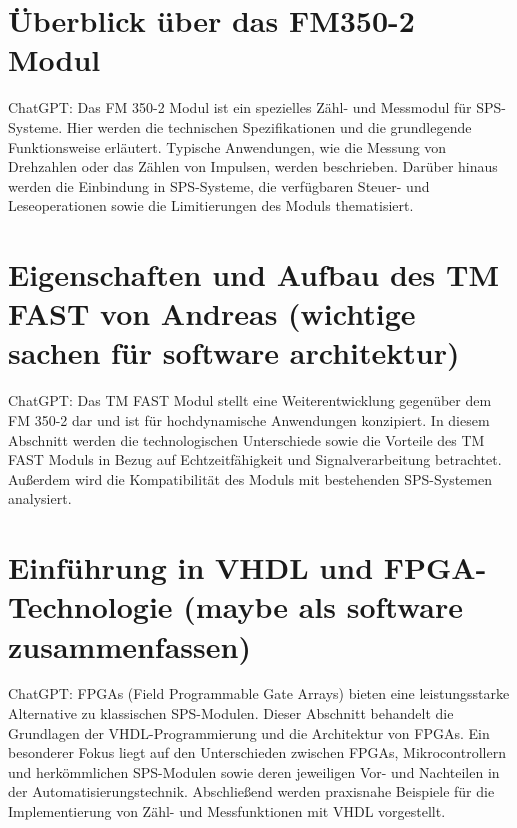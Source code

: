 \section{Überblick über das FM350-2 Modul}  
ChatGPT:
Das FM 350-2 Modul ist ein spezielles Zähl- und Messmodul für SPS-Systeme. Hier werden die technischen Spezifikationen und die grundlegende Funktionsweise erläutert.  
Typische Anwendungen, wie die Messung von Drehzahlen oder das Zählen von Impulsen, werden beschrieben.  
Darüber hinaus werden die Einbindung in SPS-Systeme, die verfügbaren Steuer- und Leseoperationen sowie die Limitierungen des Moduls thematisiert.  
\section{Eigenschaften und Aufbau des TM FAST von Andreas (wichtige sachen für software architektur)}  
ChatGPT:
Das TM FAST Modul stellt eine Weiterentwicklung gegenüber dem FM 350-2 dar und ist für hochdynamische Anwendungen konzipiert.  
In diesem Abschnitt werden die technologischen Unterschiede sowie die Vorteile des TM FAST Moduls in Bezug auf Echtzeitfähigkeit und Signalverarbeitung betrachtet.  
Außerdem wird die Kompatibilität des Moduls mit bestehenden SPS-Systemen analysiert.  
\section{Einführung in VHDL und FPGA-Technologie (maybe als software zusammenfassen)}  
ChatGPT:
FPGAs (Field Programmable Gate Arrays) bieten eine leistungsstarke Alternative zu klassischen SPS-Modulen.  
Dieser Abschnitt behandelt die Grundlagen der VHDL-Programmierung und die Architektur von FPGAs.  
Ein besonderer Fokus liegt auf den Unterschieden zwischen FPGAs, Mikrocontrollern und herkömmlichen SPS-Modulen sowie deren jeweiligen Vor- und Nachteilen in der Automatisierungstechnik.  
Abschließend werden praxisnahe Beispiele für die Implementierung von Zähl- und Messfunktionen mit VHDL vorgestellt.  
